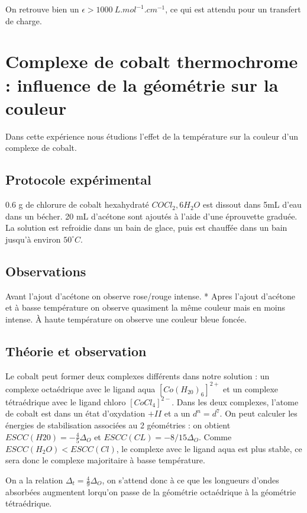 \documentclass[12pt]{article}
\begin{document}
On retrouve bien un $\epsilon > 1000 \ L.mol^{-1}.cm^{-1}$, ce qui est attendu pour un transfert de charge.

\section{Complexe de cobalt thermochrome : influence de la géométrie sur la couleur}

Dans cette expérience nous étudions l'effet de la température sur la couleur d'un complexe de cobalt. 

\subsection{Protocole expérimental}

0.6 g de chlorure de cobalt hexahydraté $COCl_2,6H_2O$ est dissout dans 5mL d'eau dans un bécher. 
20 mL d'acétone sont ajoutés à l'aide d'une éprouvette graduée.
La solution est refroidie dans un bain de glace, puis est chauffée dans un bain jusqu'à environ $50 ^\circ C$.

\subsection{Observations}

Avant l'ajout d'acétone on observe rose/rouge intense. *
Apres l'ajout d'acétone et à basse température on observe quasiment la même couleur mais en moins intense.
À haute température on observe une couleur bleue foncée.

\subsection{Théorie et observation}

Le cobalt peut former deux complexes différents dans notre solution : un complexe octaédrique avec le ligand aqua $[Co(H_20)_6]^{2+}$ et un complexe tétraédrique avec le ligand chloro $[CoCl_4]^{2-}$.
Dans les deux complexes, l'atome de cobalt est dans un état d'oxydation $+II$ et a un $d^n=d^7$.
On peut calculer les énergies de stabilisation associées au 2 géométries : on obtient $ESCC(H20)=-\frac{4}{5} \Delta_O$ et $ESCC(CL)=-8/15 \Delta_O$.
Comme $ESCC(H_2O)<ESCC(Cl)$, le complexe avec le ligand aqua est plus stable, ce sera donc le complexe majoritaire à basse température.

On a la relation $\Delta_t=\frac{4}{9}\Delta_O$, on s'attend donc à ce que les longueurs d'ondes absorbées augmentent lorqu'on passe de la géométrie octaédrique à la géométrie tétraédrique. 
\end{document}
